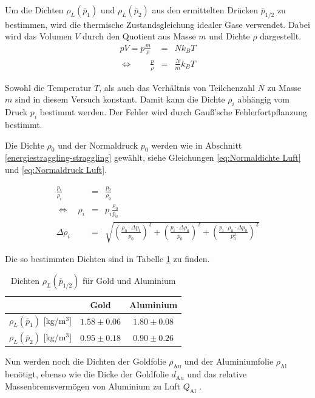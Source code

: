 \documentclass[12pt,a4paper]{scrartcl}
\numberwithin{equation}{section} %
\begin{document}
Um die Dichten $\rho_L(\bar{p}_1)$ und $\rho_L(\bar{p}_2)$ aus den ermittelten Drücken $\bar{p}_{1/2}$ zu bestimmen, wird die thermische Zustandsgleichung idealer Gase verwendet. Dabei wird das Volumen $V$ durch den Quotient aus Masse $m$ und Dichte $\rho$ dargestellt.
\begin{eqnarray}
	p V = p \frac{m}{\rho} &=& N k_B T \\
	\Leftrightarrow \qquad \frac{p}{\rho} &=& \frac{N}{m} k_B T
\end{eqnarray}

Sowohl die Temperatur $T$, als auch das Verhältnis von Teilchenzahl $N$ zu Masse $m$ sind in diesem Versuch konstant. Damit kann die Dichte $\rho_i$ abhängig vom Druck $p_i$ bestimmt werden. Der Fehler wird durch Gauß'sche Fehlerfortpflanzung bestimmt.

Die Dichte $\rho_0$ und der Normaldruck $p_0$ werden wie in Abschnitt \ref{energiestraggling-straggling} gewählt, siehe Gleichungen \eqref{eq:Normaldichte Luft} und \eqref{eq:Normaldruck Luft}. \cite{DWD}

\begin{eqnarray}
	\frac{p_i}{\rho_i} &=& \frac{p_0}{\rho_0} \\
	\Leftrightarrow \quad \rho_i &=& p_i \frac{\rho_0}{p_0} \\
	\Delta \rho_i &=& \sqrt{\left(\frac{\rho_0 \cdot \Delta p_i}{p_0}\right)^2 + \left(\frac{p_i \cdot \Delta \rho_0}{p_0}\right)^2 + \left(\frac{p_i \cdot \rho_0 \cdot \Delta p_0}{p_0^2}\right)^2}
\end{eqnarray}

Die so bestimmten Dichten sind in Tabelle \ref{table_dichten} zu finden.

\begin{table}[h!]
	\centering
	\begin{tabular}{||c||c|c||}
		\hline
		& Gold & Aluminium \\
		\hline \hline
		$\rho_L(\bar{p}_1)$ [kg/m$^3$] & $1.58 \pm 0.06$ & $1.80 \pm 0.08$ \\
		\hline
		$\rho_L(\bar{p}_2)$ [kg/m$^3$] & $0.95 \pm 0.18$ & $0.90 \pm 0.26$ \\
		\hline
	\end{tabular}
	\caption{Dichten $\rho_L(\bar{p}_{1/2})$ für Gold und Aluminium}
	\label{table_dichten}
\end{table}

Nun werden noch die Dichten der Goldfolie $\rho_\mathrm{Au}$ \cite{DichteGold} und der Aluminiumfolie $\rho_\mathrm{Al}$ \cite{DichteAlu} benötigt, ebenso wie die Dicke der Goldfolie $d_\mathrm{Au}$ \cite{Uni} und das relative Massenbremsvermögen von Aluminium zu Luft $Q_\mathrm{Al}$ \cite{Uni}.
\end{document}

